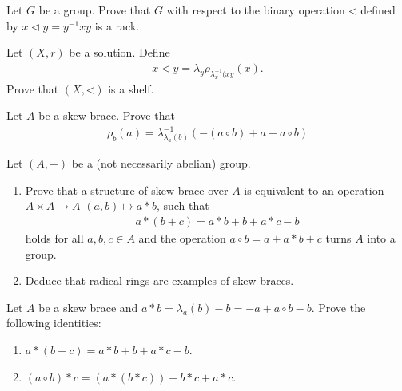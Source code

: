 \begin{exercise}
    Let $G$ be a group. 
    Prove that $G$ with respect to the binary operation $\triangleleft$ defined by $x\triangleleft y =y^{-1}xy$ is a rack.
\end{exercise}

\begin{exercise}
    Let $(X,r)$ be a solution. Define 
    \begin{align*}
        x\triangleleft y = \lambda_y\rho_{\lambda_x^{-1}(xy}(x).
    \end{align*}
    Prove that $(X,\triangleleft)$ is a shelf.
\end{exercise}


\begin{exercise}
    Let $A$ be a skew brace. Prove that
    \begin{align*}
        \rho_b(a) = \lambda^{-1}_{\lambda_a(b)}(-(a\circ b) +a+a\circ b)
    \end{align*}
\end{exercise}

\begin{exercise}
    Let $(A,+)$ be a (not necessarily abelian) group. 
    \begin{enumerate}
        \item Prove that a structure of skew brace over $A$ is equivalent to an operation $A\times A \to A$ $(a,b)\mapsto a\ast b$, such that
        \begin{align*}
            a \ast (b+c) = a\ast b + b + a\ast c - b
        \end{align*}
        holds for all $a,b,c \in A$ and the operation $a\circ b = a+ a\ast b + c$ turns $A$ into a group.
        \item Deduce that radical rings are examples of skew braces. 
        \end{enumerate}
\end{exercise}

\begin{exercise}
    Let $A$ be a skew brace and $a\ast b = \lambda_a(b)-b = -a+a\circ b - b$. Prove the following identities:
    \begin{enumerate}
        \item $a\ast (b+c) = a\ast b + b +a\ast c -b$.
        \item $(a\circ b)\ast c = (a\ast(b\ast c)) + b\ast c + a\ast c$.
    \end{enumerate}
\end{exercise}

